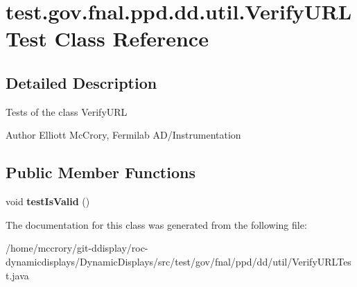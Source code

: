 \hypertarget{classtest_1_1gov_1_1fnal_1_1ppd_1_1dd_1_1util_1_1VerifyURLTest}{\section{test.\-gov.\-fnal.\-ppd.\-dd.\-util.\-Verify\-U\-R\-L\-Test Class Reference}
\label{classtest_1_1gov_1_1fnal_1_1ppd_1_1dd_1_1util_1_1VerifyURLTest}
}


\subsection{Detailed Description}
Tests of the class Verify\-U\-R\-L

\begin{DoxyAuthor}{Author}
Elliott Mc\-Crory, Fermilab A\-D/\-Instrumentation 
\end{DoxyAuthor}
\subsection*{Public Member Functions}
\begin{DoxyCompactItemize}
\item 
\hypertarget{classtest_1_1gov_1_1fnal_1_1ppd_1_1dd_1_1util_1_1VerifyURLTest_af32f5fa58e9b7d0ae024d2fa9e703ba2}{void {\bfseries test\-Is\-Valid} ()}\label{classtest_1_1gov_1_1fnal_1_1ppd_1_1dd_1_1util_1_1VerifyURLTest_af32f5fa58e9b7d0ae024d2fa9e703ba2}

\end{DoxyCompactItemize}


The documentation for this class was generated from the following file\-:\begin{DoxyCompactItemize}
\item 
/home/mccrory/git-\/ddisplay/roc-\/dynamicdisplays/\-Dynamic\-Displays/src/test/gov/fnal/ppd/dd/util/Verify\-U\-R\-L\-Test.\-java\end{DoxyCompactItemize}
